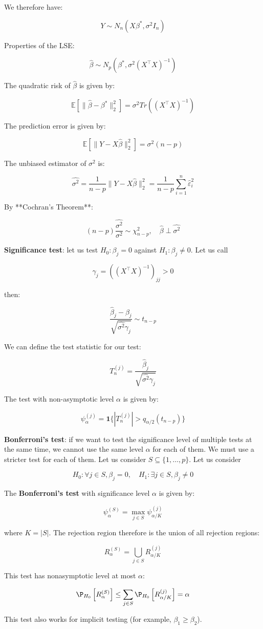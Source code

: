 We therefore have:

$$Y \sim N_n(X\beta^{*}, \sigma^2 I_n)$$

Properties of the LSE:

$$\hat{\beta} \sim N_p(\beta^{*}, \sigma^2(X^\top X)^{-1})$$

The quadratic risk of $\hat{\beta}$ is given by:

$$\mathbb{E}\left[\|\hat{\beta} - \beta^{*}\|^2_2\right] = \sigma^2 Tr \left((X^\top X)^{-1}\right)$$

The prediction error is given by:

$$\mathbb{E}\left[\|Y - X\hat{\beta}\|^2_2\right] = \sigma^2(n - p)$$

The unbiased estimator of $\sigma^2$ is:

$$\hat{\sigma^2} = \frac{1}{n-p}\|Y - X\hat{\beta}\|^2_2 = \frac1{n-p}\sum_{i=1}^n\hat{\varepsilon}_i^2$$

By **Cochran's Theorem**:

$$ (n-p)\frac{\hat{\sigma^2}}{\sigma^2} \sim \chi^2_{n-p}, \quad \hat\beta \perp \hat{\sigma^2}$$

\textbf{Significance test}: let us test $H_0: \beta_j = 0$ against $H_1: \beta_j \neq 0$. Let us call

$$\gamma_j = \left((X^\top X)^{-1}\right)_{jj} > 0$$

then:

$$\frac{\hat{\beta}_j- \beta_j}{\sqrt{\hat{\sigma^2}\gamma_j}} \sim t_{n-p}$$

We can define the test statistic for our test:

$$T_n^{(j)} = \frac{\hat{\beta}_j}{\sqrt{\hat{\sigma^2}\gamma_j}}$$

The test with non-asymptotic level $\alpha$ is given by:

$$\psi_\alpha^{(j)} = \textbf{1}\{|T_n^{(j)}| > q_{\alpha/2}(t_{n-p})\}$$

\textbf{Bonferroni's test}: if we want to test the significance level of multiple tests at the same time, we cannot use the same level $\alpha$ for each of them. We must use a stricter test for each of them. Let us consider $S \subseteq \{1, \ldots, p\}$. Let us consider

$$H_0: \forall j \in S, \beta_j = 0, \quad H_1: \exists j \in S, \beta_j \neq 0$$

The \textbf{Bonferroni's test} with significance level $\alpha$ is given by:

$$\psi_\alpha^{(S)} = \max_{j \in S}\psi_{\alpha/K}^{(j)}$$

where $K = |S|$. The rejection region therefore is the union of all rejection regions:

$$R_\alpha^{(S)} = \bigcup_{j \in S}R_{\alpha/K}^{(j)}$$

This test has nonasymptotic level at most $\alpha$:

$$\P_{H_0}\left[R_\alpha^{(S)}\right] \leq \sum_{j\in S}\P_{H_0}\left[R_{\alpha/K}^{(j)}\right] = \alpha$$

This test also works for implicit testing (for example, $\beta_1 \geq \beta_2$).
